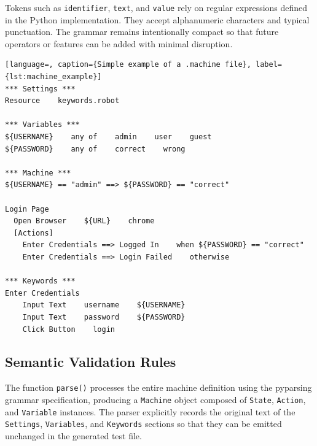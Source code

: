 Tokens such as \texttt{identifier}, \texttt{text}, and \texttt{value} rely on
regular expressions defined in the Python implementation. They accept alphanumeric
characters and typical punctuation. The grammar remains intentionally compact so
that future operators or features can be added with minimal disruption. 

\begin{lstlisting}[language=, caption={Simple example of a .machine file}, label={lst:machine_example}]
*** Settings ***
Resource    keywords.robot

*** Variables ***
${USERNAME}    any of    admin    user    guest
${PASSWORD}    any of    correct    wrong

*** Machine ***
${USERNAME} == "admin" ==> ${PASSWORD} == "correct"

Login Page
  Open Browser    ${URL}    chrome
  [Actions]
    Enter Credentials ==> Logged In    when ${PASSWORD} == "correct"
    Enter Credentials ==> Login Failed    otherwise

*** Keywords ***
Enter Credentials
    Input Text    username    ${USERNAME}
    Input Text    password    ${PASSWORD}
    Click Button    login
\end{lstlisting}

\subsection{Semantic Validation Rules}

The function \texttt{parse()} processes the entire machine definition
using the pyparsing grammar specification, producing a \texttt{Machine} object
composed of \texttt{State}, \texttt{Action}, and \texttt{Variable} instances.
The parser explicitly records the original text of the \texttt{Settings},
\texttt{Variables}, and \texttt{Keywords} sections so that they can be emitted
unchanged in the generated test file.

